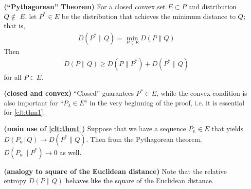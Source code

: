 \documentclass{article}
\newcommand{\bfs}[1]{\textbf{({#1})}}
\begin{document}
\begin{thma}{\bfs{``Pythagorean'' Theorem}}\label{clt:thm1}
For a closed convex set $E \subset P$ and distribution $Q \notin$ $E$, let $P^{*} \in E$ be the distribution that achieves the minimum distance to $Q$; that is,
\begin{align*}
D\left(P^{*} \| Q\right)=\min _{P \in E} D(P \| Q)
\end{align*}
Then
\begin{align*}
D(P \| Q) \geq D\left(P \| P^{*}\right)+D\left(P^{*} \| Q\right)
\end{align*}
for all $P \in E$.
\end{thma}
\begin{rema}{\bfs{closed and convex}}\label{clt:rem2}
``Closed'' guarantees $P^* \in E$, while the convex condition is also important for  ``$P_\lambda\in E$'' in the very beginning of the  proof, i.e. it is essential for \cref{clt:thm1}.
\end{rema}
\begin{rema}{\bfs{main use of \cref{clt:thm1}}}\label{clt:rem3}
Suppose that we have a sequence $P_{n} \in E$ that yields $D\left(P_{n}|| Q\right) \rightarrow D\left(P^{*} \| Q\right)$. Then from the Pythagorean theorem, $D\left(P_{n} \| P^{*}\right) \rightarrow 0$ as well.
\end{rema}
\begin{rema}{\bfs{analogy to square of the Euclidean distance}}\label{clt:rem4}
Note that the relative entropy $D(P \| Q)$ behaves like the square of the Euclidean distance.
\end{rema}
\end{document}
